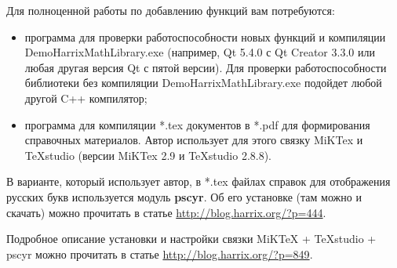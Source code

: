 Для полноценной работы по добавлению функций вам потребуются:
\begin{itemize}
\item программа для проверки работоспособности новых функций и компиляции DemoHarrixMathLibrary.exe (например, Qt 5.4.0 с Qt Creator 3.3.0 или любая другая версия Qt с пятой версии). Для проверки работоспособности библиотеки без компиляции DemoHarrixMathLibrary.exe подойдет любой другой C++ компилятор;
\item программа для компиляции *.tex документов в *.pdf для формирования справочных материалов. Автор использует для этого связку MiKTex и TeXstudio (версии MiKTex 2.9 и TeXstudio 2.8.8).
\end{itemize}

В варианте, который использует автор, в *.tex файлах справок для отображения русских букв используется модуль \textbf{pscyr}. Об его установке (там можно и скачать) можно прочитать в статье \href{http://blog.harrix.org/?p=444}{http://blog.harrix.org/?p=444}.

Подробное описание установки и настройки связки MiKTeX + TeXstudio + pscyr можно прочитать в статье \href{http://blog.harrix.org/?p=849}{http://blog.harrix.org/?p=849}.

